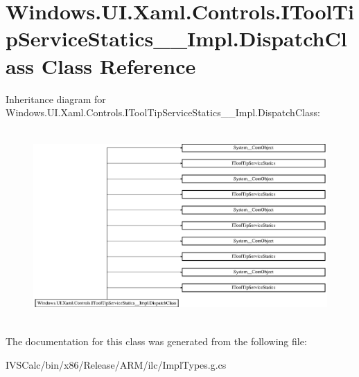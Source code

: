 \hypertarget{class_windows_1_1_u_i_1_1_xaml_1_1_controls_1_1_i_tool_tip_service_statics_____impl_1_1_dispatch_class}{}\section{Windows.\+U\+I.\+Xaml.\+Controls.\+I\+Tool\+Tip\+Service\+Statics\+\_\+\+\_\+\+Impl.\+Dispatch\+Class Class Reference}
\label{class_windows_1_1_u_i_1_1_xaml_1_1_controls_1_1_i_tool_tip_service_statics_____impl_1_1_dispatch_class}
Inheritance diagram for Windows.\+U\+I.\+Xaml.\+Controls.\+I\+Tool\+Tip\+Service\+Statics\+\_\+\+\_\+\+Impl.\+Dispatch\+Class\+:\begin{figure}[H]
\begin{center}
\leavevmode
\includegraphics[height=7.386091cm]{class_windows_1_1_u_i_1_1_xaml_1_1_controls_1_1_i_tool_tip_service_statics_____impl_1_1_dispatch_class}
\end{center}
\end{figure}


The documentation for this class was generated from the following file\+:\begin{DoxyCompactItemize}
\item 
I\+V\+S\+Calc/bin/x86/\+Release/\+A\+R\+M/ilc/Impl\+Types.\+g.\+cs\end{DoxyCompactItemize}
